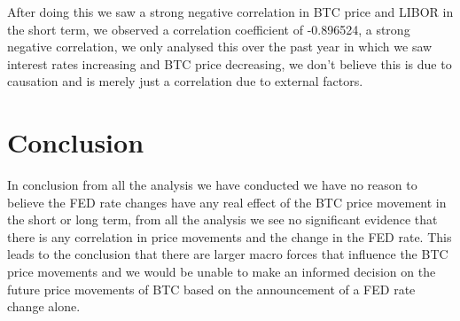 \documentclass[12pt]{article}
\begin{document}
After doing this we saw a strong negative correlation in BTC price and LIBOR in the short term, we observed a correlation coefficient of -0.896524, a strong negative correlation, we only analysed this over the past year in which we saw interest rates increasing and BTC price decreasing, we don't believe this is due to causation and is merely just a correlation due to external factors.
\section{Conclusion}
In conclusion from all the analysis we have conducted we have no reason to believe the FED rate changes have any real effect of the BTC price movement in the short or long term, from all the analysis we see no significant evidence that there is any correlation in price movements and the change in the FED rate. This leads to the conclusion that there are larger macro forces that influence the BTC price movements and we would be unable to make an informed decision on the future price movements of BTC based on the announcement of a FED rate change alone.
\end{document}
